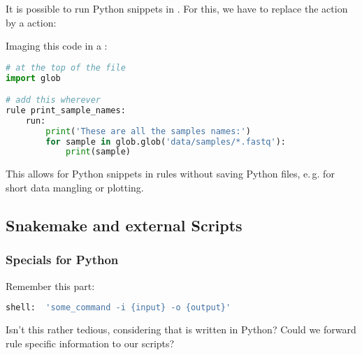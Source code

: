 \begin{frame}[fragile]
  \frametitle{}
  \vspace{-0.5em}
  It is possible to run Python snippets in \Snakemake{}. For this, we have to replace the  action by a  action:\vspace{-0.5em}
  \begin{task}
  	Imaging this code in a :
  \end{task}\vspace{-0.5em}
  \begin{lstlisting}[language=Python,style=Python, basicstyle=\footnotesize]
# at the top of the file
import glob

# add this wherever
rule print_sample_names:
    run:
        print('These are all the samples names:')
        for sample in glob.glob('data/samples/*.fastq'):
            print(sample)

  \end{lstlisting}\vspace{-0.5em}
  \pause\footnotesize
  \begin{hint}
     This allows for Python snippets in rules without saving Python files, e.\,g. for short data mangling or plotting.
  \end{hint}
\end{frame}

\subsection{Snakemake and external Scripts}

\begin{frame}[fragile]
  \frametitle{\Snakemake{} Specials for Python}
  Remember this part:
  \begin{lstlisting}[language=Python,style=Python]
shell:  'some_command -i {input} -o {output}'
  \end{lstlisting}
  \begin{question}
  	Isn't this rather tedious, considering that \Snakemake{} is written in Python? Could we forward rule specific information to our scripts?
  \end{question}
\end{frame}


